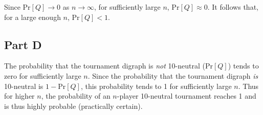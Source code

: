 \documentclass{article}
\begin{document}
Since $\mathrm{Pr}[Q] \to 0$ as $n \to \infty$, for sufficiently large $n$,
$\mathrm{Pr}[Q] \approx 0$. It follows that, for a large enough $n$,
$\mathrm{Pr}[Q] < 1$.

\break

\subsection*{Part D}

The probability that the tournament digraph is \textit{not} 10-neutral
($\mathrm{Pr}[Q]$) tends to zero for sufficiently large $n$. Since the
probability that the tournament digraph \textit{is} 10-neutral is $1 -
\mathrm{Pr}[Q]$, this probability tends to 1 for sufficiently large $n$. Thus
for higher $n$, the probability of an $n$-player 10-neutral tournament reaches
1 and is thus highly probable (practically certain).
\end{document}
